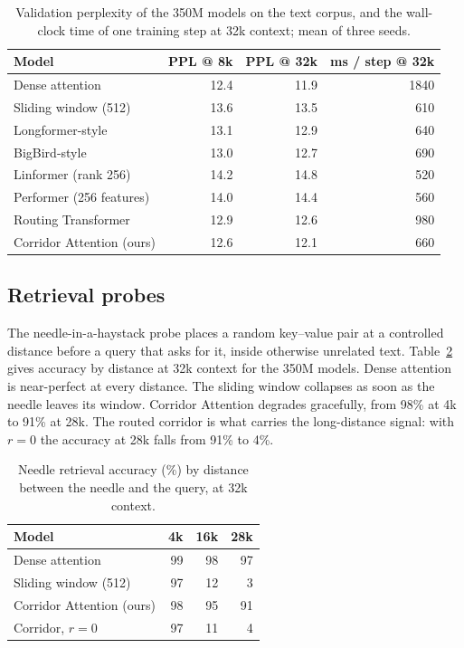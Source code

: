 \documentclass[11pt]{article}
\begin{document}
\begin{table}[t]
  \centering
  \begin{tabular}{lrrr}
    \toprule
    Model & PPL @ 8k & PPL @ 32k & ms / step @ 32k \\
    \midrule
    Dense attention           & 12.4 & 11.9 & 1840 \\
    Sliding window (512)      & 13.6 & 13.5 &  610 \\
    Longformer-style          & 13.1 & 12.9 &  640 \\
    BigBird-style             & 13.0 & 12.7 &  690 \\
    Linformer (rank 256)      & 14.2 & 14.8 &  520 \\
    Performer (256 features)  & 14.0 & 14.4 &  560 \\
    Routing Transformer       & 12.9 & 12.6 &  980 \\
    Corridor Attention (ours) & 12.6 & 12.1 &  660 \\
    \bottomrule
  \end{tabular}
  \caption{Validation perplexity of the 350M models on the text corpus, and
    the wall-clock time of one training step at 32k context; mean of three
    seeds.}
  \label{tab:main}
\end{table}

\subsection{Retrieval probes}\label{sec:probes}

The needle-in-a-haystack probe places a random key--value pair at a
controlled distance before a query that asks for it, inside otherwise
unrelated text. Table~\ref{tab:needle} gives accuracy by distance at 32k
context for the 350M models. Dense attention is near-perfect at every
distance. The sliding window collapses as soon as the needle leaves its
window. Corridor Attention degrades gracefully, from 98\% at 4k to 91\% at
28k. The routed corridor is what carries the long-distance signal: with
$r = 0$ the accuracy at 28k falls from 91\% to 4\%.

\begin{table}[t]
  \centering
  \begin{tabular}{lrrr}
    \toprule
    Model & 4k & 16k & 28k \\
    \midrule
    Dense attention           & 99 & 98 & 97 \\
    Sliding window (512)      & 97 & 12 &  3 \\
    Corridor Attention (ours) & 98 & 95 & 91 \\
    Corridor, $r = 0$         & 97 & 11 &  4 \\
    \bottomrule
  \end{tabular}
  \caption{Needle retrieval accuracy (\%) by distance between the needle and
    the query, at 32k context.}
  \label{tab:needle}
\end{table}
\end{document}
